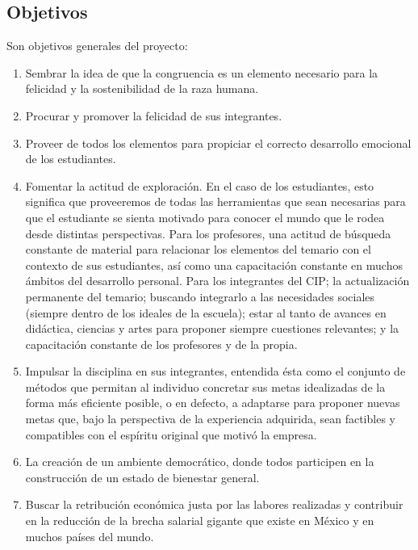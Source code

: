 \documentclass[10pt,letterpaper,oneside]{book}
\begin{document}
\subsection{Objetivos}
Son objetivos generales del proyecto:
\begin{enumerate}
\item Sembrar la idea de que la congruencia es un elemento necesario para la felicidad y la sostenibilidad de la raza humana.
\item Procurar y promover la felicidad de sus integrantes.
\item Proveer de todos los elementos para propiciar el correcto desarrollo emocional de los estudiantes.
\item Fomentar la actitud de exploración. En el caso de los estudiantes, esto significa que proveeremos de todas las herramientas que sean necesarias para que el estudiante se sienta motivado para conocer el mundo que le rodea desde distintas perspectivas. Para los profesores, una actitud de búsqueda constante de material para relacionar los elementos del temario con el contexto de sus estudiantes, así como una capacitación constante en muchos ámbitos del desarrollo personal. Para los integrantes del CIP; la actualización permanente del temario; buscando integrarlo a las necesidades sociales (siempre dentro de los ideales de la escuela); estar al tanto de avances en didáctica, ciencias y artes para proponer siempre cuestiones relevantes; y la capacitación constante de los profesores y de la propia.
\item Impulsar la disciplina en sus integrantes, entendida ésta como el conjunto de métodos que permitan al individuo concretar sus metas idealizadas de la forma más eficiente posible, o en defecto, a adaptarse para proponer nuevas metas que, bajo la perspectiva de la experiencia adquirida, sean factibles y compatibles con el espíritu original que motivó la empresa.
\item La creación de un ambiente democrático, donde todos participen en la construcción de un estado de bienestar general.
\item Buscar la retribución económica justa por las labores realizadas y contribuir en la reducción de la brecha salarial gigante que existe en México y en muchos países del mundo.
\end{enumerate}
\end{document}
